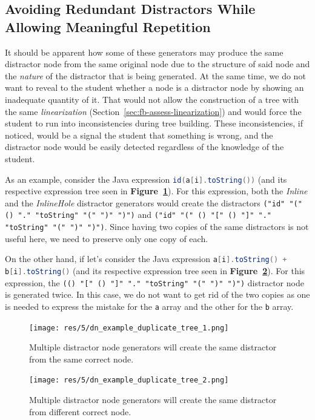 \begin{chapterBody}
\subsection{Avoiding Redundant Distractors While Allowing Meaningful Repetition}

It should be apparent how some of these generators may produce the same
distractor node from the same original node due to the structure of said node
and the \textit{nature} of the distractor that is being generated.
At the same time, we do not want to reveal to the student whether a node is a 
distractor node by showing an inadequate quantity of it. That would not allow
the construction of a tree with the same \textit{linearization}
(Section~\ref{sec:fb-assess-linearization}) and would force the
student to run into inconsistencies during tree building. These
inconsistencies, if noticed, would be a signal the student that something is
wrong, and the distractor node would be easily detected regardless of the
knowledge of the student.

As an example, consider the Java expression
\lstinline[language=Java]{id(a[i].toString())}
(and its respective expression tree seen in
\textbf{Figure~\ref{fig:dn-duplicate-1}}). For this expression, both the
\textit{Inline} and the \textit{InlineHole} distractor generators would create
the distractors 
\lstinline[language=etl]{("id" "(" () "." "toString" "(" ")" ")")} and
\lstinline[language=etl]{("id" "(" () "[" () "]" "." "toString" "(" ")" ")")}.
Since having two copies of the same distractors is not useful here, we need to
preserve only one copy of each. 

On the other hand, if let's consider the Java expression
\lstinline[language=Java]{a[i].toString() + b[i].toString()}
(and its respective expression tree seen in
\textbf{Figure~\ref{fig:dn-duplicate-2}}). For this expression,
the  \lstinline[language=etl]{(() "[" () "]" "." "toString" "(" ")" ")")} 
distractor node is generated twice. In this case, we do not want to get rid of
the two copies as one is needed to express the mistake for the \texttt{a} array
and the other for the \texttt{b} array.

\begin{figure}[htb!]
    \centering
    \texttt{[image: res/5/dn\_example\_duplicate\_tree\_1.png]}
    \caption{Multiple distractor node generators will create the same distractor
from the same correct node.}
    \label{fig:dn-duplicate-1}
\end{figure}

\begin{figure}[htb!]
    \centering
    \texttt{[image: res/5/dn\_example\_duplicate\_tree\_2.png]}
    \caption{Multiple distractor node generators will create the same distractor
from different correct node.}
    \label{fig:dn-duplicate-2}
\end{figure}


\end{chapterBody}

